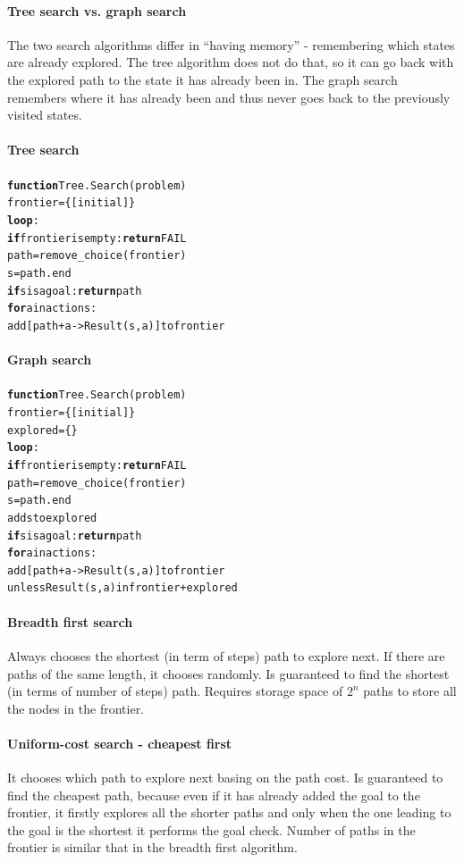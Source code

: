 \documentclass[a4paper,10pt]{article}
\begin{document}
\paragraph{Tree search vs. graph search} 

The two search algorithms differ in ``having memory'' - remembering which states are already explored. The tree algorithm does not do that, so it can go back with the explored path to the state it has already been in. The graph search remembers where it has already been and thus never goes back to the previously visited states.
\paragraph{Tree search}
\begin{alltt}
\textbf{function} Tree.Search(problem)
  frontier = \{[initial]\}
  \textbf{loop}:
    \textbf{if} frontier is empty: \textbf{return} FAIL
    path = remove_choice(frontier)
    s = path.end
    \textbf{if} s is a goal: \textbf{return} path
    \textbf{for} a in actions:
      add [path + a -> Result(s,a)] to frontier
\end{alltt}

\paragraph{Graph search}
\begin{alltt}
\textbf{function} Tree.Search(problem)
  frontier = \{[initial]\}
  explored = \{\}
  \textbf{loop}:
    \textbf{if} frontier is empty: \textbf{return} FAIL
    path = remove_choice(frontier)
    s = path.end
    add s to explored
    \textbf{if} s is a goal: \textbf{return} path
    \textbf{for} a in actions:
      add [path + a -> Result(s,a)] to frontier 
      unless Result(s,a) in frontier + explored
\end{alltt}

\paragraph{Breadth first search}
Always chooses the shortest (in term of steps) path to explore next. If there are paths of the same length, it chooses randomly. Is guaranteed to find the shortest (in terms of number of steps) path. Requires storage space of $2^n$ paths to store all the nodes in the frontier.

\paragraph{Uniform-cost search - cheapest first}
It chooses which path to explore next basing on the path cost. Is guaranteed to find the cheapest path, because even if it has already added the goal to the frontier, it firstly explores all the shorter paths and only when the one leading to the goal is the shortest it performs the goal check. Number of paths in the frontier is similar that in the breadth first algorithm.
\end{document}
